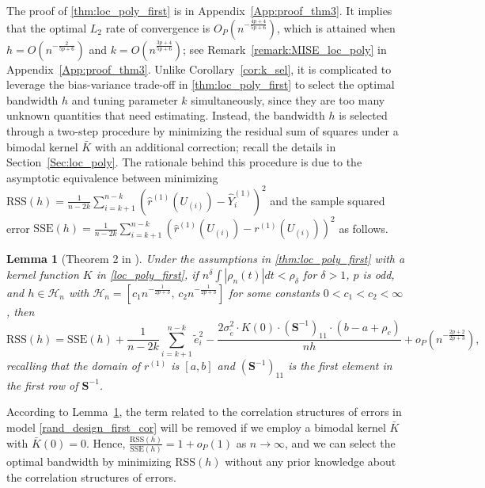 \documentclass{uwstat572}
\newtheorem{lemma}[theorem]{Lemma}
\theoremstyle{definition}
\renewcommand{\hat}{\widehat}
\renewcommand{\tilde}{\widetilde}
\theoremstyle{theorem}
\begin{document}
\noindent The proof of \autoref{thm:loc_poly_first} is in Appendix~\ref{App:proof_thm3}. It implies that the optimal $L_2$ rate of convergence is $O_P\left(n^{-\frac{4p+4}{5p+6}}\right)$, which is attained when $h=O\left(n^{-\frac{2}{5p+6}}\right)$ and $k=O\left(n^{\frac{3p+4}{5p+6}}\right)$; see Remark~\ref{remark:MISE_loc_poly} in Appendix~\ref{App:proof_thm3}. Unlike Corollary~\ref{cor:k_sel}, it is complicated to leverage the bias-variance trade-off in \autoref{thm:loc_poly_first} to select the optimal bandwidth $h$ and tuning parameter $k$ simultaneously, since they are too many unknown quantities that need estimating. Instead, the bandwidth $h$ is selected through a two-step procedure by minimizing the residual sum of squares under a bimodal kernel $\bar{K}$ with an additional correction; recall the details in Section~\ref{Sec:loc_poly}. The rationale behind this procedure is due to the asymptotic equivalence between minimizing $\mathrm{RSS}(h)=\frac{1}{n-2k} \sum_{i=k+1}^{n-k} \left(\hat{r}^{(1)}(U_{(i)}) -\hat{Y}_i^{(1)} \right)^2$ and the sample squared error $\mathrm{SSE}(h) = \frac{1}{n-2k} \sum_{i=k+1}^{n-k} \left(\hat{r}^{(1)}(U_{(i)}) -r^{(1)}(U_{(i)}) \right)^2$ as follows.

\begin{lemma}[Theorem 2 in \citealt{de2018local}]
\label{lem:RSS_SSE}
Under the assumptions in \autoref{thm:loc_poly_first} with a kernel function $K$ in \eqref{loc_poly_first}, if $n^{\delta} \int |\rho_n(t)| dt < \rho_{\delta}$ for $\delta >1$, $p$ is odd, and $h\in \mathcal{H}_n$ with $\mathcal{H}_n=\left[c_1 n^{-\frac{1}{2p+3}},\, c_2 n^{-\frac{1}{2p+3}}\right]$ for some constants $0<c_1<c_2<\infty$, then
$$\mathrm{RSS}(h) = \mathrm{SSE}(h) + \frac{1}{n-2k} \sum_{i=k+1}^{n-k} \tilde{e}_i^2 - \frac{2\sigma_{\tilde{e}}^2\cdot K(0) \cdot \left(\bm{S}^{-1}\right)_{11}\cdot(b-a +\rho_c)}{nh} + o_P\left(n^{-\frac{2p+2}{2p+3}}\right),$$
recalling that the domain of $r^{(1)}$ is $[a,b]$ and $\left(\bm{S}^{-1}\right)_{11}$ is the first element in the first row of $\bm{S}^{-1}$.
\end{lemma}

\noindent According to Lemma~\ref{lem:RSS_SSE}, the term related to the correlation structures of errors in model \eqref{rand_design_first_cor} will be removed if we employ a bimodal kernel $\bar{K}$ with $\bar{K}(0)=0$. Hence, $\frac{\mathrm{RSS}(h)}{\mathrm{SSE}(h)} = 1+o_P(1)$ as $n\to\infty$, and we can select the optimal bandwidth by minimizing $\mathrm{RSS}(h)$ without any prior knowledge about the correlation structures of errors.
\end{document}

